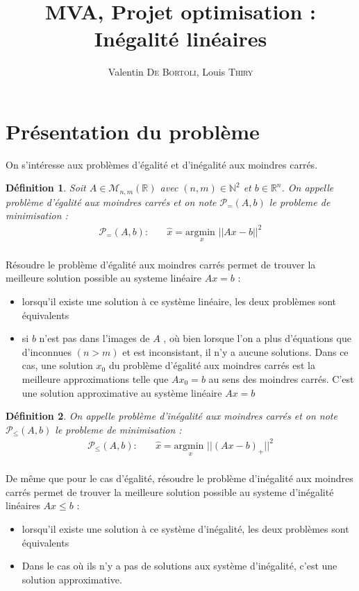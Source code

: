 \documentclass[10pt,a4paper]{article}
\title{MVA, Projet optimisation : Inégalité linéaires}
\author{Valentin \textsc{De Bortoli}, Louis \textsc{Thiry}}
\newtheorem{mydef}{Définition}
\begin{document}
\maketitle
\tableofcontents

\section{Présentation du problème}

On s'intéresse aux problèmes d'égalité et d'inégalité aux moindres carrés.

\begin{mydef}
  Soit $A \in \mathcal{M}_{n,m}(\mathbb{R})$ avec $(n,m) \in \mathbb{N}^2$ et $b \in \mathbb{R}^{n}$.
    On appelle problème d'égalité aux moindres carrés et on note $\mathcal{P}_{=} (A, b)$ le probleme de minimisation :
    \begin{align*}
      \mathcal{P}_{=}(A, b): \quad & \hat{x} = \underset{x}{\text{argmin }}  ||Ax - b||^{2}\\
    \end{align*}
\end{mydef}
Résoudre le problème d'égalité aux moindres carrés permet de trouver la meilleure solution possible au systeme linéaire $Ax = b$ :
\begin{itemize}
  \item lorsqu'il existe une solution à ce système linéaire, les deux problèmes sont équivalents
  \item si $b$ n'est pas dans l'images de $A$ , où bien lorsque l'on a plus d'équations que d'inconnues $(n > m)$ et est inconsistant, il n'y a aucune solutions.
    Dans ce cas, une solution $x_0$ du problème d'égalité aux moindres carrés est la meilleure approximations telle que $Ax_0 = b$ au sens des moindres carrés.
    C'est une solution approximative au système linéaire $Ax = b$
\end{itemize}

\begin{mydef}
  On appelle problème d'inégalité aux moindres carrés et on note $\mathcal{P}_{\leq} (A, b)$ le probleme de minimisation :
    \begin{align*}
      \mathcal{P}_{\leq} (A, b): \quad & \hat{x} = \underset{x}{\text{argmin }}  ||(Ax - b)_+||^{2}\\
    \end{align*}
\end{mydef}
De même que pour le cas d'égalité, résoudre le problème d'inégalité aux moindres carrés permet de trouver la meilleure solution possible au systeme d'inégalité linéaires $Ax \leq b$ :
\begin{itemize}
  \item lorsqu'il existe une solution à ce système d'inégalité, les deux problèmes sont équivalents
  \item Dans le cas où ils n'y a pas de solutions aux système d'inégalité, c'est une solution approximative.
\end{itemize}
\end{document}
